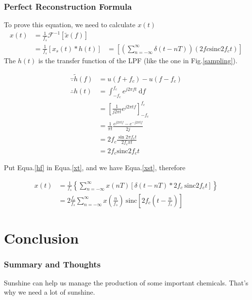 \documentclass{article}
\begin{document}
\subsubsection*{Perfect Reconstruction Formula}

To prove this equation, we need to calculate $x(t)$
\begin{align} x(t) & = \frac{1}{f_s} \mathcal{F}^{-1} \left[ \widetilde{x}
 (f) \right] \nonumber \\
         & = \frac{1}{f_s} \left[ x_s(t) * h(t) \right] \label{xt}
    &= \left[ \left( \sum_{n = -\infty}^{\infty} \delta(t - nT) \right) \left( 2fc \mathrm{sinc} 2f_c t \right) \right]
\end{align} 
The $h(t)$ is the transfer function of the LPF (like the one in
 Fig.\ref{sampling}).

\begin{align}
    \because \widetilde{h}(f) & = u(f + f_c) - u(f - f_c)\nonumber  \\
    \therefore h(t)           & = \int_{-f_c}^{f_c} e^{j2 \pi ft} ~ \mathrm{d}f \nonumber                 \\
                              & = \left[ \frac{1}{j2 \pi t} e^{j2 \pi t f} \right]_{-f_c }^{f_c}\nonumber \\
                              & = \frac{1}{\pi t} \frac{e^{j2 \pi t f} - e^{- j2 \pi t f}}{2j}\nonumber   \\
                              & = 2f_c \frac{\sin 2\pi f_c t}{2f_c \pi t} \nonumber  \\
                              & = 2f_c \mathrm{sinc} 2f_c t \label{hf}
\end{align}

Put Equa.\ref{hf} in Equa.\ref{xt}, and we have Equa.\ref{xst}, therefore

\begin{align} x(t) & = \frac{1}{f_s} \left\{ \sum_{n = -\infty}^{\infty} x(nT) \left[ \delta(t - nT) * 2f_c ~ \mathrm
 {sinc} 2f_c t \right] \right\}\nonumber \\
         & = 2 \frac{f_c}{f_s} \sum_{n = -\infty}^{\infty}  x(\frac{n}{f_s}) ~ \mathrm{sinc}\left[ 2f_c(t - \frac{n}
           {f_s}) \right]
\end{align}

\section{Conclusion}
    \subsubsection*{Summary and Thoughts} Sunshine can help us manage the production of some important chemicals. That's
     why we need a lot of sunshine.
\end{document}
